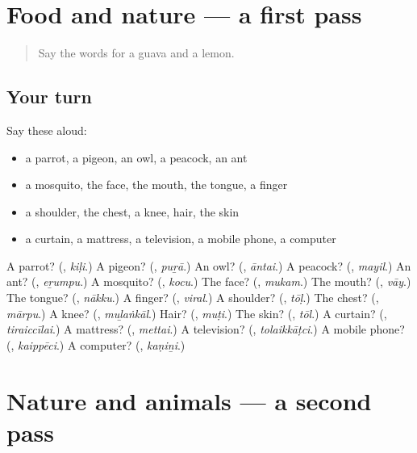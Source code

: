 \section[(dialogue)]{Food and nature — a first pass}

\label{lesson:TA-R139-first-pass-food-and-nature}



\begin{quote}
Say the words for a guava and a lemon.
\end{quote}

\subsection*{Your turn}
Say these aloud:

\begin{itemize}
\raggedright
  \item a parrot, a pigeon, an owl, a peacock, an ant
  \item a mosquito, the face, the mouth, the tongue, a finger
  \item a shoulder, the chest, a knee, hair, the skin
  \item a curtain, a mattress, a television, a mobile phone, a computer
\end{itemize}

\begin{tcolorbox}[breakable,colback=teal!4,colframe=teal!35!black,title={Before you move on}]
A parrot? (\textbf{}, \emph{kiḷi}.) A pigeon? (\textbf{}, \emph{puṟā}.) An owl? (\textbf{}, \emph{āntai}.) A peacock? (\textbf{}, \emph{mayil}.) An ant? (\textbf{}, \emph{eṟumpu}.) A mosquito? (\textbf{}, \emph{kocu}.) The face? (\textbf{}, \emph{mukam}.) The mouth? (\textbf{}, \emph{vāy}.) The tongue? (\textbf{}, \emph{nākku}.) A finger? (\textbf{}, \emph{viral}.) A shoulder? (\textbf{}, \emph{tōḷ}.) The chest? (\textbf{}, \emph{mārpu}.) A knee? (\textbf{}, \emph{muḻaṅkāl}.) Hair? (\textbf{}, \emph{muṭi}.) The skin? (\textbf{}, \emph{tōl}.) A curtain? (\textbf{}, \emph{tiraiccīlai}.) A mattress? (\textbf{}, \emph{mettai}.) A television? (\textbf{}, \emph{tolaikkāṭci}.) A mobile phone? (\textbf{}, \emph{kaippēci}.) A computer? (\textbf{}, \emph{kaṇiṉi}.)
\end{tcolorbox}
\section[(dialogue)]{Nature and animals — a second pass}

